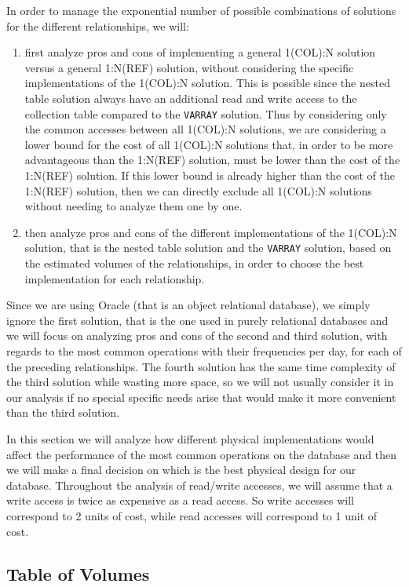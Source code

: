In order to manage the exponential number of possible combinations of solutions for the different relationships, we will:
\begin{enumerate}
    \item first analyze pros and cons of implementing a general 1(COL):N solution versus a general 1:N(REF) solution, without considering the specific implementations of the 1(COL):N solution. This is possible since the nested table solution always have an additional read and write access to the collection table compared to the \texttt{VARRAY} solution. Thus by considering only the common accesses between all 1(COL):N solutions, we are considering a lower bound for the cost of all 1(COL):N solutions that, in order to be more advantageous than the 1:N(REF) solution, must be lower than the cost of the 1:N(REF) solution. If this lower bound is already higher than the cost of the 1:N(REF) solution, then we can directly exclude all 1(COL):N solutions without needing to analyze them one by one.
    \item then analyze pros and cons of the different implementations of the 1(COL):N solution, that is the nested table solution and the \texttt{VARRAY} solution, based on the estimated volumes of the relationships, in order to choose the best implementation for each relationship.
\end{enumerate}

Since we are using Oracle (that is an object relational database), we simply ignore the first solution, that is the one used in purely relational databases and we will focus on analyzing pros and cons of the second and third solution, with regards to the most common operations with their frequencies per day, for each of the preceding relationships. The fourth solution has the same time complexity of the third solution while wasting more space, so we will not usually consider it in our analysis if no special specific needs arise that would make it more convenient than the third solution.

In this section we will analyze how different physical implementations would affect the performance of the most common operations on the database and then we will make a final decision on which is the best physical design for our database. Throughout the analysis of read/write accesses, we will assume that a write access is twice as expensive as a read access. So write accesses will correspond to 2 units of cost, while read accesses will correspond to 1 unit of cost.

\subsection{Table of Volumes}

